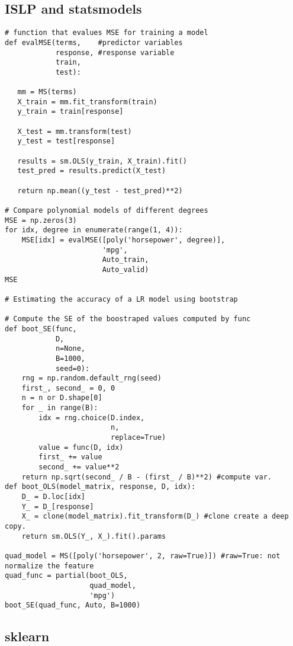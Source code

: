 \documentclass[
  letterpaper,
  DIV=11,
  numbers=noendperiod]{scrreprt}
\begin{document}
\subsection{ISLP and statsmodels}\label{islp-and-statsmodels-1}

\begin{verbatim}
# function that evalues MSE for training a model
def evalMSE(terms,    #predictor variables
            response, #response variable
            train,
            test):

   mm = MS(terms)
   X_train = mm.fit_transform(train)
   y_train = train[response]

   X_test = mm.transform(test)
   y_test = test[response]

   results = sm.OLS(y_train, X_train).fit()
   test_pred = results.predict(X_test)

   return np.mean((y_test - test_pred)**2)

# Compare polynomial models of different degrees
MSE = np.zeros(3)
for idx, degree in enumerate(range(1, 4)):
    MSE[idx] = evalMSE([poly('horsepower', degree)],
                       'mpg',
                       Auto_train,
                       Auto_valid)
MSE

# Estimating the accuracy of a LR model using bootstrap

# Compute the SE of the boostraped values computed by func                      
def boot_SE(func,
            D,
            n=None,
            B=1000,
            seed=0):
    rng = np.random.default_rng(seed)
    first_, second_ = 0, 0
    n = n or D.shape[0]
    for _ in range(B):
        idx = rng.choice(D.index,
                         n,
                         replace=True)
        value = func(D, idx)
        first_ += value
        second_ += value**2
    return np.sqrt(second_ / B - (first_ / B)**2) #compute var. 
def boot_OLS(model_matrix, response, D, idx):
    D_ = D.loc[idx]
    Y_ = D_[response]
    X_ = clone(model_matrix).fit_transform(D_) #clone create a deep copy. 
    return sm.OLS(Y_, X_).fit().params
    
quad_model = MS([poly('horsepower', 2, raw=True)]) #raw=True: not normalize the feature
quad_func = partial(boot_OLS,
                    quad_model,
                    'mpg')
boot_SE(quad_func, Auto, B=1000)
\end{verbatim}

\subsection{sklearn}\label{sklearn-1}
\end{document}
